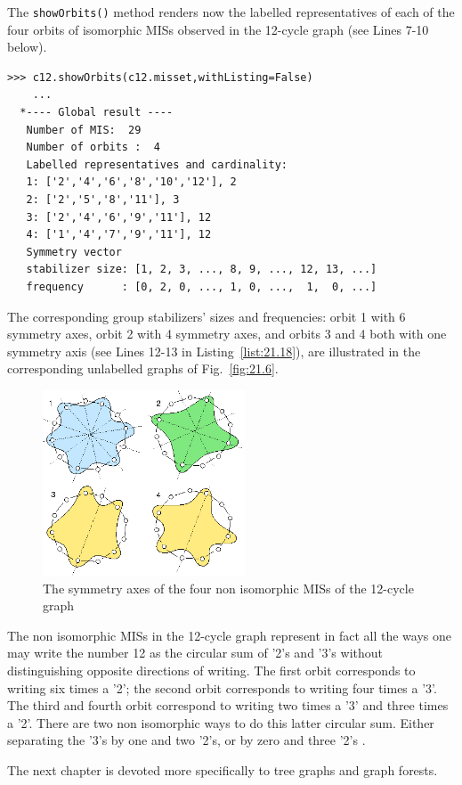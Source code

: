 The \texttt{showOrbits()} method renders now the labelled representatives of each of the four orbits of isomorphic MISs observed in the 12-cycle graph (see Lines 7-10 below).
\begin{lstlisting}[caption={Computing the MISs orbits of the 12-cycle graph},label=list:21.18]
>>> c12.showOrbits(c12.misset,withListing=False)
    ...
  *---- Global result ----
   Number of MIS:  29
   Number of orbits :  4
   Labelled representatives and cardinality:
   1: ['2','4','6','8','10','12'], 2
   2: ['2','5','8','11'], 3
   3: ['2','4','6','9','11'], 12
   4: ['1','4','7','9','11'], 12
   Symmetry vector
   stabilizer size: [1, 2, 3, ..., 8, 9, ..., 12, 13, ...]
   frequency      : [0, 2, 0, ..., 1, 0, ...,  1,  0, ...]
\end{lstlisting}
The corresponding group stabilizers' sizes and frequencies: orbit 1 with 6 symmetry axes, orbit 2 with 4 symmetry axes, and orbits 3 and 4 both with one symmetry axis (see Lines 12-13 in Listing~\vref{list:21.18}), are illustrated in the corresponding unlabelled graphs of Fig.~\vref{fig:21.6}.
\begin{figure}[h]
\sidecaption[t]
\includegraphics[width=6cm]{Figures/21-5-c12.png}
\caption{The symmetry axes of the four non isomorphic MISs of the 12-cycle graph} 
\label{fig:21.5}       %
\end{figure}

The non isomorphic MISs in the 12-cycle graph represent in fact all the ways one may write the number 12 as the circular sum of '2's and '3's without distinguishing opposite directions of writing. The first orbit corresponds to writing six times a '2'; the second orbit corresponds to writing four times a '3'. The third and fourth orbit correspond to writing two times a '3' and three times a '2'. There are two non isomorphic ways to do this latter circular sum. Either separating the '3's by one and two '2's, or by zero and three '2's \citep{ISO-2008}.

\vspace{1cm}

\noindent The next chapter is devoted more specifically to tree graphs and graph forests.

\clearpage

\typeout{}

%
